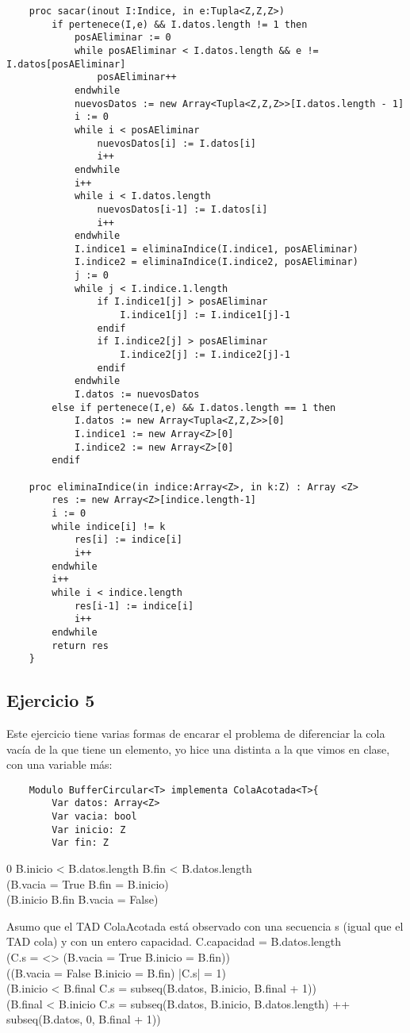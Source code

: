 \documentclass[10pt,a4paper]{article}
\begin{document}
\begin{lstlisting}
	proc sacar(inout I:Indice, in e:Tupla<Z,Z,Z>)
		if pertenece(I,e) && I.datos.length != 1 then
			posAEliminar := 0 
			while posAEliminar < I.datos.length && e != I.datos[posAEliminar]
				posAEliminar++
			endwhile
			nuevosDatos := new Array<Tupla<Z,Z,Z>>[I.datos.length - 1]
			i := 0 
			while i < posAEliminar
				nuevosDatos[i] := I.datos[i]
				i++
			endwhile
			i++
			while i < I.datos.length
				nuevosDatos[i-1] := I.datos[i]
				i++
			endwhile
			I.indice1 = eliminaIndice(I.indice1, posAEliminar)
			I.indice2 = eliminaIndice(I.indice2, posAEliminar)
			j := 0 
			while j < I.indice.1.length
				if I.indice1[j] > posAEliminar
					I.indice1[j] := I.indice1[j]-1
				endif
				if I.indice2[j] > posAEliminar
					I.indice2[j] := I.indice2[j]-1
				endif
			endwhile
			I.datos := nuevosDatos
		else if pertenece(I,e) && I.datos.length == 1 then
			I.datos := new Array<Tupla<Z,Z,Z>>[0]
			I.indice1 := new Array<Z>[0]
			I.indice2 := new Array<Z>[0]
		endif

	proc eliminaIndice(in indice:Array<Z>, in k:Z) : Array <Z>
		res := new Array<Z>[indice.length-1]
		i := 0
		while indice[i] != k
			res[i] := indice[i]
			i++
		endwhile
		i++
		while i < indice.length
			res[i-1] := indice[i]
			i++
		endwhile
		return res
	}

\end{lstlisting}

\subsection{Ejercicio 5}
Este ejercicio tiene varias formas de encarar el problema de diferenciar la cola vacía de la que tiene un elemento, yo hice una distinta
a la que vimos en clase, con una variable más:

\begin{lstlisting}
	Modulo BufferCircular<T> implementa ColaAcotada<T>{
		Var datos: Array<Z>
		Var vacia: bool
		Var inicio: Z
		Var fin: Z
\end{lstlisting}

{0 \le B.inicio < B.datos.length  \le B.fin < B.datos.length \land \\
(B.vacia = True \implica B.fin = B.inicio) \land \\
(B.inicio \neq B.fin \implica B.vacia = False)}

Asumo que el TAD ColaAcotada está observado con una secuencia s (igual que el TAD cola) y con un entero capacidad.
{C.capacidad = B.datos.length \land \\ (C.s = <> \iff (B.vacia = True \land B.inicio = B.fin)) \land \\
((B.vacia = False \land B.inicio = B.fin) \implica |C.s| = 1) \land \\
(B.inicio < B.final \implica C.s = subseq(B.datos, B.inicio, B.final + 1)) \land \\
(B.final < B.inicio \implica C.s = subseq(B.datos, B.inicio, B.datos.length) ++ subseq(B.datos, 0, B.final + 1))}
\end{document}
